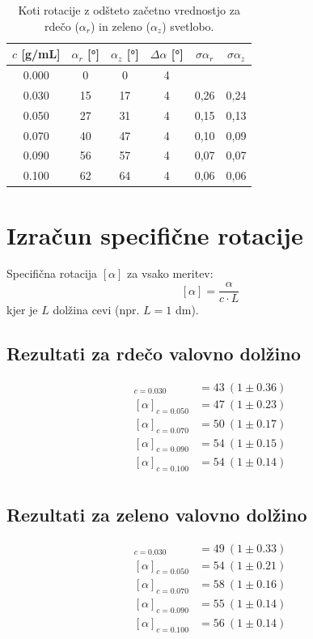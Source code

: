 \documentclass[9pt,a4paper,twocolumn,twoside]{tau-class/tau}
\begin{document}
\begin{table}[H]
\centering
\begin{tabular}{cccccc}
\toprule
$c$ [g/mL] & $\alpha_r$ [°] & $\alpha_z$ [°]  & $\Delta \alpha$ [°] & $\sigma \alpha_r$ & $\sigma \alpha_z$ \\
\midrule
0.000 & 0  & 0 & 4 &  \\
0.030 & 15 & 17 & 4 & 0,26 & 0,24 \\
0.050 & 27 & 31 & 4 & 0,15 & 0,13 \\
0.070 & 40 & 47 & 4 & 0,10 & 0,09 \\
0.090 & 56 & 57 & 4 & 0,07 & 0,07 \\
0.100 & 62 & 64 & 4 & 0,06 & 0,06 \\
\bottomrule
\end{tabular}
\caption{Koti rotacije z odšteto začetno vrednostjo za rdečo ($\alpha_r$) in zeleno ($\alpha_z$) svetlobo.}
\end{table}


\section{Izračun specifične rotacije}

Specifična rotacija $[\alpha]$ za vsako meritev:
\[
[\alpha] = \frac{\alpha}{c \cdot L}
\]
kjer je $L$ dolžina cevi (npr. $L = 1$ dm).

\subsection{Rezultati za rdečo valovno dolžino}
\begin{align*}
[\alpha]_{c=0.030} &= 43 \ (1 \pm 0.36) \\
[\alpha]_{c=0.050} &= 47 \ (1 \pm 0.23) \\
[\alpha]_{c=0.070} &= 50 \ (1 \pm 0.17) \\
[\alpha]_{c=0.090} &= 54 \ (1 \pm 0.15) \\
[\alpha]_{c=0.100} &= 54 \ (1 \pm 0.14) \\
\end{align*}

\subsection{Rezultati za zeleno valovno dolžino}
\begin{align*}
[\alpha]_{c=0.030} &= 49 \ (1 \pm 0.33) \\
[\alpha]_{c=0.050} &= 54 \ (1 \pm 0.21) \\
[\alpha]_{c=0.070} &= 58 \ (1 \pm 0.16) \\
[\alpha]_{c=0.090} &= 55 \ (1 \pm 0.14) \\
[\alpha]_{c=0.100} &= 56 \ (1 \pm 0.14) \\
\end{align*}
\end{document}
